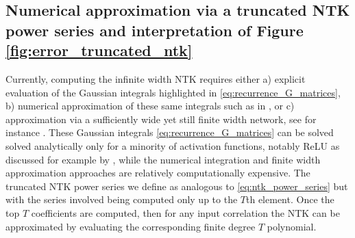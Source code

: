 \subsection{Numerical approximation via a truncated NTK power series and interpretation of Figure \ref{fig:error_truncated_ntk}} \label{appendix:numerical_approx_ntk}
Currently, computing the infinite width NTK requires either 
a) explicit evaluation of the Gaussian integrals highlighted in \eqref{eq:recurrence_G_matrices}, 
b) numerical approximation of these same integrals such as in \cite{LeeBNSPS18}, or 
c) approximation via a sufficiently wide yet still finite width network, see for instance \cite{torchNTK, pmlr-v162-novak22a}. These Gaussian integrals \eqref{eq:recurrence_G_matrices} can be solved solved analytically only for a minority of activation functions, notably ReLU as discussed for example by \cite{arora_exact_comp}, while the numerical integration and finite width approximation approaches are relatively computationally expensive.
The truncated NTK power series we define as analogous to \eqref{eq:ntk_power_series} but with the series involved being computed only up to the $T$th element. Once the top $T$ coefficients are computed, then for any input correlation the NTK can be approximated by evaluating the corresponding finite degree $T$ polynomial.

